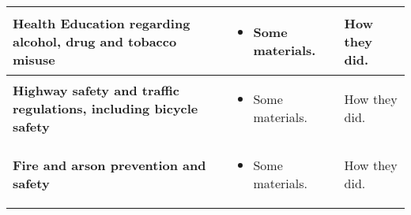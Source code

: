 \documentclass[10pt]{article}
\begin{document}
\begin{tabularx}{\textwidth}{ |p{2in}|X|X| }
\hline

{\bf Health Education regarding alcohol, drug and tobacco misuse} &
\begin{itemize}
\item Some materials.
\end{itemize} &

How they did. \\

\hline

{\bf Highway safety and traffic regulations, including bicycle safety} &
\begin{itemize}
\item Some materials.
\end{itemize} &

How they did. \\

\hline

{\bf Fire and arson prevention and safety} &
\begin{itemize}
\item Some materials.
\end{itemize} &

How they did. \\

\hline

\end{tabularx}
\end{document}

